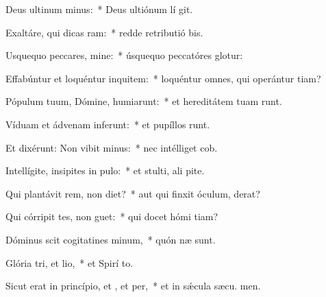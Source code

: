 \item Deus ultinum minus:~* Deus ultiónum lí git.
\item Exaltáre, qui dicas ram:~* redde retributió bis.
\item Usquequo peccares, mine:~* úsquequo peccatóres glotur:
\item Effabúntur et loquéntur inquitem:~* loquéntur omnes, qui operántur tiam?
\item Pópulum tuum, Dómine, humiarunt:~* et hereditátem tuam runt.
\item Víduam et ádvenam inferunt:~* et pupíllos runt.
\item Et dixérunt: Non vibit minus:~* nec intélliget  cob.
\item Intellígite, insipites in pulo:~* et stulti, ali pite.
\item Qui plantávit rem, non diet?~* aut qui finxit óculum,  derat?
\item Qui córripit tes, non guet:~* qui docet hómi tiam?
\item Dóminus scit cogitatines minum,~* quón næ sunt.
\item Glória tri, et lio,~* et Spirí to.
\item Sicut erat in princípio, et , et per,~* et in sǽcula sæcu. men.
